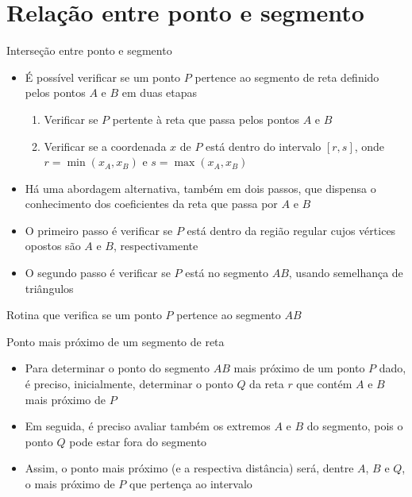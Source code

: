 \section{Relação entre ponto e segmento}

\begin{frame}[fragile]{Interseção entre ponto e segmento}
    \begin{itemize}
        \item É possível verificar se um ponto $P$ pertence ao segmento de reta definido pelos pontos $A$ e $B$ em duas etapas
        \pause
        \begin{enumerate}
            \item Verificar se $P$ pertente à reta que passa pelos pontos $A$ e $B$
            \pause

            \item Verificar se a coordenada $x$ de $P$ está dentro do intervalo $[r, s]$, onde $r = \min(x_A, x_B)$ e $s = \max(x_A, x_B)$
        \end{enumerate}
            \pause

        \item Há uma abordagem alternativa, também em dois passos, que dispensa o conhecimento dos coeficientes da reta que passa por $A$ e $B$
        \pause


        \item O primeiro passo é verificar se $P$ está dentro da região regular cujos vértices opostos são $A$ e $B$, respectivamente
        \pause

        \item O segundo passo é verificar se $P$ está no segmento $AB$, usando semelhança de triângulos
    \end{itemize} 

\end{frame}

\begin{frame}[fragile]{Rotina que verifica se um ponto $P$ pertence ao segmento $AB$}
\end{frame}


\begin{frame}[fragile]{Ponto mais próximo de um segmento de reta}

    \begin{itemize}
        \item Para determinar o ponto do segmento $AB$ mais próximo de um ponto $P$ dado, é
            preciso, inicialmente, determinar o ponto $Q$ da reta $r$ que contém $A$ e $B$ mais
            próximo de $P$
        \pause

        \item Em seguida, é preciso avaliar também os extremos $A$ e $B$ do segmento, pois o ponto
            $Q$ pode estar fora do segmento
        \pause

        \item Assim, o ponto mais próximo (e a respectiva distância) será, dentre $A$, $B$ e $Q$,
            o mais próximo de $P$ que pertença ao intervalo

    \end{itemize}

\end{frame}

